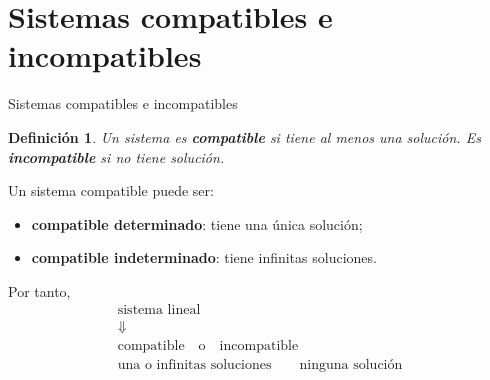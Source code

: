 \documentclass[aspectratio=169,9pt]{beamer}
\newtheorem{definicion}{Definición}[section]
\theoremstyle{remark}
\begin{document}
\section{Sistemas compatibles e incompatibles}
\begin{frame}[allowframebreaks,t]{Sistemas compatibles e incompatibles}
\begin{definicion}
Un sistema es \textbf{compatible} si tiene al menos una solución. Es \textbf{incompatible} si no tiene
solución.
\end{definicion}

Un sistema compatible puede ser:
\begin{itemize}
\item \textbf{compatible determinado}: tiene una única solución;
\item \textbf{compatible indeterminado}: tiene infinitas soluciones.
\end{itemize}

Por tanto,
\[
\boxed{
\begin{array}{c}
\text{sistema lineal}\\[1mm]
\Downarrow\\
\text{compatible}\quad\text{o}\quad\text{incompatible}\\
\text{una o infinitas soluciones}\qquad\text{ninguna solución}
\end{array}}
\]
\end{frame}
\end{document}

